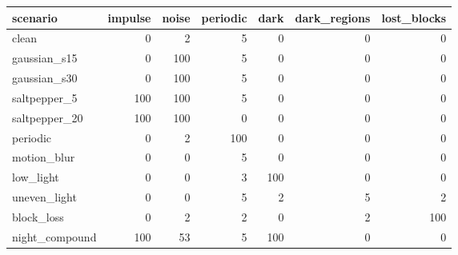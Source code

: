 \begin{tabular}{lrrrrrr}
\toprule
scenario & impulse & noise & periodic & dark & dark_regions & lost_blocks \\
\midrule
clean & 0 & 2 & 5 & 0 & 0 & 0 \\
gaussian_s15 & 0 & 100 & 5 & 0 & 0 & 0 \\
gaussian_s30 & 0 & 100 & 5 & 0 & 0 & 0 \\
saltpepper_5 & 100 & 100 & 5 & 0 & 0 & 0 \\
saltpepper_20 & 100 & 100 & 0 & 0 & 0 & 0 \\
periodic & 0 & 2 & 100 & 0 & 0 & 0 \\
motion_blur & 0 & 0 & 5 & 0 & 0 & 0 \\
low_light & 0 & 0 & 3 & 100 & 0 & 0 \\
uneven_light & 0 & 0 & 5 & 2 & 5 & 2 \\
block_loss & 0 & 2 & 2 & 0 & 2 & 100 \\
night_compound & 100 & 53 & 5 & 100 & 0 & 0 \\
\bottomrule
\end{tabular}
